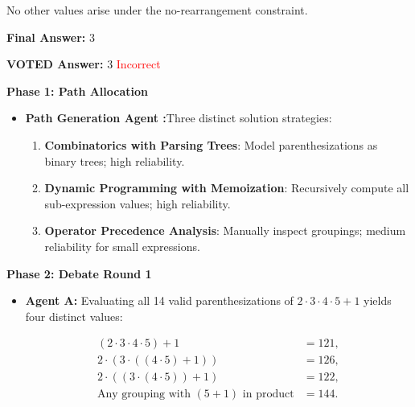\begin{tcolorbox}
\begin{itemize}[leftmargin=1.5em, nosep]
No other values arise under the no-rearrangement constraint.

\medskip
\noindent\textbf{Final Answer:} $\boxed{3}$
    \end{itemize}

    \vspace{0.1cm}
    \textbf{VOTED Answer:} $\boxed{3}$ \textcolor{red}{Incorrect}
\end{tcolorbox}

\begin{tcolorbox}[
    breakable,
    lines before break=0,
    enlarge top initially by=0mm,
    pad at break=1mm,
    colback=blue!5!white,
    colframe=blue!60!black,
    title=\textbf{\sffamily DynaDebate (Ours)},
    fonttitle=\small\bfseries,
    boxrule=0.5pt,
    sharp corners,
    left=2pt, right=2pt, top=2pt, bottom=2pt
]
    \footnotesize
    \textbf{Phase 1: Path Allocation}
    \begin{itemize}[leftmargin=1.5em, nosep]
        \item \textbf{Path Generation Agent :}Three distinct solution strategies:

\begin{enumerate}[left=0pt,topsep=2pt,itemsep=0pt]
    \item \textbf{Combinatorics with Parsing Trees}: Model parenthesizations as binary trees; high reliability.
    \item \textbf{Dynamic Programming with Memoization}: Recursively compute all sub-expression values; high reliability.
    \item \textbf{Operator Precedence Analysis}: Manually inspect groupings; medium reliability for small expressions.
\end{enumerate}

    \end{itemize}

    \vspace{0.1cm}
    \textbf{Phase 2: Debate Round 1 }
    \begin{itemize}[leftmargin=1.5em, nosep]
        \item \textbf{Agent A:} Evaluating all 14 valid parenthesizations of $2 \cdot 3 \cdot 4 \cdot 5 + 1$ yields four distinct values:

\begin{align*}
(2\cdot3\cdot4\cdot5) + 1 &= 121, \\
2 \cdot (3 \cdot ((4 \cdot 5) + 1)) &= 126, \\
2 \cdot ((3 \cdot (4 \cdot 5)) + 1) &= 122, \\
\text{Any grouping with } (5+1) \text{ in product} &= 144.
\end{align*}


\end{itemize}
\end{tcolorbox}

